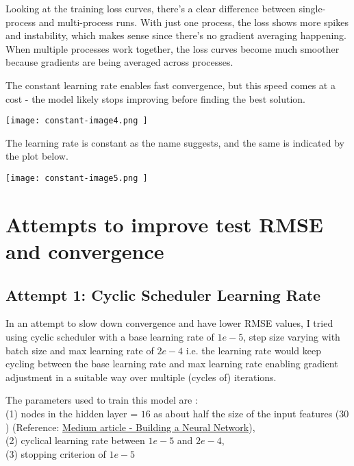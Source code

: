 \documentclass{article}
\begin{document}
Looking at the training loss curves, there's a clear difference between single-process and multi-process runs. With just one process, the loss shows more spikes and instability, which makes sense since there's no gradient averaging happening. When multiple processes work together, the loss curves become much smoother because gradients are being averaged across processes.

The constant learning rate enables fast convergence, but this speed comes at a cost - the model likely stops improving before finding the best solution.

\begin{center}
\texttt{[image: constant-image4.png ]}
\end{center}

The learning rate is constant as the name suggests, and the same is indicated by the plot below.

\begin{center}
\texttt{[image: constant-image5.png ]}
\end{center}

\section{Attempts to improve test RMSE and convergence}

\subsection {Attempt 1: Cyclic Scheduler Learning Rate }
In an attempt to slow down convergence and have lower RMSE values, I tried using cyclic scheduler with a base learning rate of $1e-5$, step size varying with batch size and max learning rate of $2e-4$ i.e. the learning rate would keep cycling between the base learning rate and max learning rate enabling gradient adjustment in a suitable way over multiple (cycles of) iterations.

The parameters used to train this model are : \\
(1) nodes in the hidden layer = $16$ as about half the size of the input features ($30$) (Reference: \href{https://medium.com/data-science/17-rules-of-thumb-for-building-a-neural-network-93356f9930af}{Medium article - Building a Neural Network}), \\
(2) cyclical learning rate between $1e-5$ and $2e-4$, \\
(3) stopping criterion of $1e-5$ \\
\end{document}
